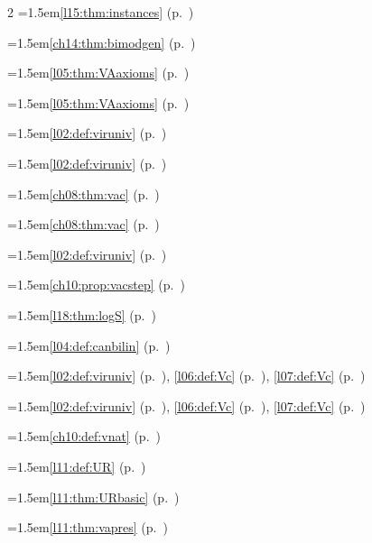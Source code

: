 \begin{multicols}{2}
\hangindent=1.5em\quad \ref{l15:thm:instances} (p.~\pageref{l15:thm:instances})\par
\hangindent=1.5em\quad \ref{ch14:thm:bimodgen} (p.~\pageref{ch14:thm:bimodgen})\par
\hangindent=1.5em\quad \ref{l05:thm:VAaxioms} (p.~\pageref{l05:thm:VAaxioms})\par
\hangindent=1.5em\quad \ref{l05:thm:VAaxioms} (p.~\pageref{l05:thm:VAaxioms})\par
\hangindent=1.5em\quad \ref{l02:def:viruniv} (p.~\pageref{l02:def:viruniv})\par
\hangindent=1.5em\quad \ref{l02:def:viruniv} (p.~\pageref{l02:def:viruniv})\par
\hangindent=1.5em\quad \ref{ch08:thm:vac} (p.~\pageref{ch08:thm:vac})\par
\hangindent=1.5em\quad \ref{ch08:thm:vac} (p.~\pageref{ch08:thm:vac})\par
\hangindent=1.5em\quad \ref{l02:def:viruniv} (p.~\pageref{l02:def:viruniv})\par
\hangindent=1.5em\quad \ref{ch10:prop:vacstep} (p.~\pageref{ch10:prop:vacstep})\par
\hangindent=1.5em\quad \ref{l18:thm:logS} (p.~\pageref{l18:thm:logS})\par
\hangindent=1.5em\quad \ref{l04:def:canbilin} (p.~\pageref{l04:def:canbilin})\par
\hangindent=1.5em\quad \ref{l02:def:viruniv} (p.~\pageref{l02:def:viruniv}), \ref{l06:def:Vc} (p.~\pageref{l06:def:Vc}), \ref{l07:def:Vc} (p.~\pageref{l07:def:Vc})\par
\hangindent=1.5em\quad \ref{l02:def:viruniv} (p.~\pageref{l02:def:viruniv}), \ref{l06:def:Vc} (p.~\pageref{l06:def:Vc}), \ref{l07:def:Vc} (p.~\pageref{l07:def:Vc})\par
\hangindent=1.5em\quad \ref{ch10:def:vnat} (p.~\pageref{ch10:def:vnat})\par
\hangindent=1.5em\quad \ref{l11:def:UR} (p.~\pageref{l11:def:UR})\par
\hangindent=1.5em\quad \ref{l11:thm:URbasic} (p.~\pageref{l11:thm:URbasic})\par
\hangindent=1.5em\quad \ref{l11:thm:vapres} (p.~\pageref{l11:thm:vapres})\par

\end{multicols}
